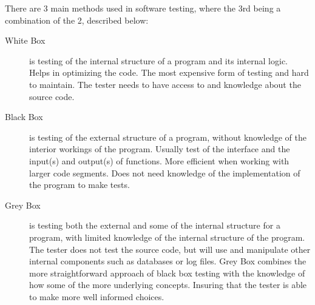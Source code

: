 There are 3 main methods used in software testing, where the 3rd being a combination of the 2, described below:
\begin{description}
\item [White Box] is testing of the internal structure of a program and its internal logic. Helps in optimizing the code. The most expensive form of testing and hard to maintain. The tester needs to have access to and knowledge about the source code.
\item [Black Box] is testing of the external structure of a program, without knowledge of the interior workings of the program. Usually test of the interface and the input(s) and output(s) of functions. More efficient when working with larger code segments. Does not need knowledge of the implementation of the program to make tests.
\item [Grey Box] is testing both the external and some of the internal structure for a program, with limited knowledge of the internal structure of the program. The tester does not test the source code, but will use and manipulate other internal components such as databases or log files. Grey Box combines the more straightforward approach of black box testing with the knowledge of how some of the more underlying concepts. Insuring that the tester is able to make more well informed choices.
\end{description}






